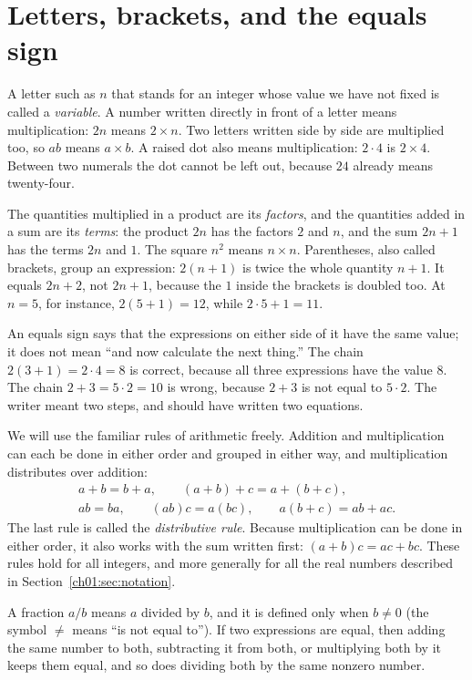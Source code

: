 \section{Letters, brackets, and the equals sign}\label{ch01:sec:letters}
A letter such as $n$ that stands for an integer whose value we have not fixed is called a \emph{variable}. A number written directly in front of a letter means multiplication: $2n$ means $2\times n$. Two letters written side by side are multiplied too, so $ab$ means $a\times b$. A raised dot also means multiplication: $2\cdot4$ is $2\times4$. Between two numerals the dot cannot be left out, because $24$ already means twenty-four.

The quantities multiplied in a product are its \emph{factors}, and the quantities added in a sum are its \emph{terms}: the product $2n$ has the factors $2$ and $n$, and the sum $2n+1$ has the terms $2n$ and $1$. The square $n^2$ means $n\times n$. Parentheses, also called brackets, group an expression: $2(n+1)$ is twice the whole quantity $n+1$. It equals $2n+2$, not $2n+1$, because the $1$ inside the brackets is doubled too. At $n=5$, for instance, $2(5+1)=12$, while $2\cdot5+1=11$.

An equals sign says that the expressions on either side of it have the same value; it does not mean ``and now calculate the next thing.'' The chain $2(3+1)=2\cdot4=8$ is correct, because all three expressions have the value $8$. The chain $2+3=5\cdot2=10$ is wrong, because $2+3$ is not equal to $5\cdot2$. The writer meant two steps, and should have written two equations.

We will use the familiar rules of arithmetic freely. Addition and multiplication can each be done in either order and grouped in either way, and multiplication distributes over addition:
\begin{gather*}
a+b=b+a,\qquad (a+b)+c=a+(b+c),\\
ab=ba,\qquad (ab)c=a(bc),\qquad a(b+c)=ab+ac.
\end{gather*}
The last rule is called the \emph{distributive rule}. Because multiplication can be done in either order, it also works with the sum written first: $(a+b)c=ac+bc$. These rules hold for all integers, and more generally for all the real numbers described in Section~\ref{ch01:sec:notation}.

A fraction $a/b$ means $a$ divided by $b$, and it is defined only when $b\ne0$ (the symbol $\ne$ means ``is not equal to''). If two expressions are equal, then adding the same number to both, subtracting it from both, or multiplying both by it keeps them equal, and so does dividing both by the same nonzero number.

